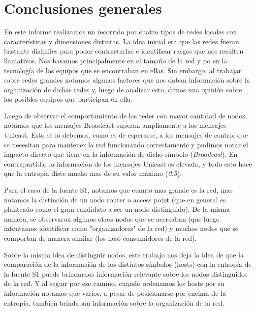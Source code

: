 \section{Conclusiones generales}

\par En este informe realizamos un recorrido por cuatro tipos de redes locales con características y dimensiones distintas. La idea inicial era que las redes fueran bastante disímiles para poder contrastarlas e identificar rasgos que nos resulten llamativos. Nos basamos principalmente en el tamaño de la red y no en la tecnología de los equipos que se encontraban en ellas. Sin embargo, al trabajar sobre redes grandes notamos algunos factores que nos daban información sobre la organización de dichas redes y, luego de analizar esto, dimos una opinión sobre los posibles equipos que participan en ella.

\par Luego de observar el comportamiento de las redes con mayor cantidad de nodos, notamos que los mensajes Broadcast superan ampliamente a los mensajes Unicast. Esto se lo debemos, como es de esperarse, a los mensajes de control que se necesitan para mantener la red funcionando correctamente y pudimos notar el impacto directo que tiene en la información de dicho símbolo (\textit{Broadcast}). En contrapartida, la información de los mensajes Unicast es elevada, y todo esto hace que la entropía diste mucho mas de su valor máximo (\textit{0.5}).

\par Para el caso de la fuente S1, notamos que cuanto mas grande es la red, mas notamos la distinción de un nodo router o access point (que en general es planteado como el gran candidato a ser un nodo distinguido). De la misma manera, se observaron algunos otros nodos que se acercaban (que luego intentamos identificar como "organizadores" de la red) y muchos nodos que se comportan de manera similar (los host consumidores de la red).

\par Sobre la misma idea de distinguir nodos, este trabajo nos deja la idea de que la comparación de la información de los distintos símbolos (hosts) con la entropía de la fuente S1 puede brindarnos información relevante sobre los nodos distinguidos de la red. Y al seguir por ese camino, cuando ordenamos los hosts por su información notamos que varios, a pesar de posicionarse por encima de la entropía, también brindaban información sobre la organización de la red.
